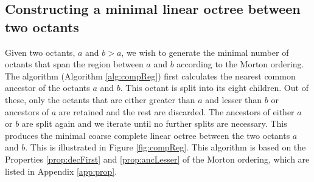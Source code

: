 \subsection{Constructing a minimal linear octree between two octants}
\label{sec:compReg}
Given two octants, $a$ and  $b > a$, we wish to generate the minimal number of octants that span the region between $a$ and $b$ according to the Morton ordering. The algorithm (Algorithm \ref{alg:compReg}) first calculates the nearest common ancestor of the octants $a$ and $b$. This octant is split into its eight children. Out of these, only the octants that are either greater than $a$ and lesser than $b$ or ancestors of $a$ are retained and the rest are discarded. The ancestors of either $a$ or $b$ are split again and we iterate until no further splits are necessary. This produces the minimal coarse complete linear octree between the two octants $a$ and $b$. This is illustrated in Figure \ref{fig:compReg}. This algorithm is based on the Properties \ref{prop:decFirst} and \ref{prop:ancLesser} of the Morton ordering, which are listed in Appendix \ref{app:prop}.

